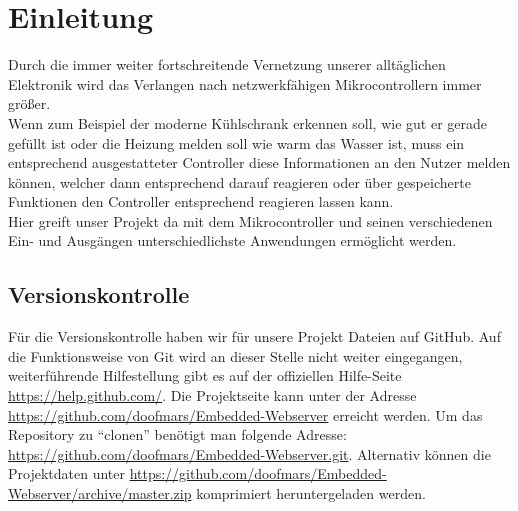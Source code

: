 \chapter{Einleitung}

Durch die immer weiter fortschreitende Vernetzung unserer alltäglichen Elektronik
wird das Verlangen nach netzwerkfähigen Mikrocontrollern
immer größer. \\
Wenn zum Beispiel der moderne Kühlschrank erkennen soll, wie gut er gerade
gefüllt ist oder die Heizung melden soll wie warm das Wasser ist, muss ein
entsprechend ausgestatteter Controller diese Informationen an den Nutzer
melden können, welcher dann entsprechend darauf reagieren oder über gespeicherte 
Funktionen den Controller entsprechend reagieren lassen kann.\\ 
Hier greift unser Projekt da mit dem Mikrocontroller und seinen
verschiedenen Ein- und Ausgängen unterschiedlichste Anwendungen ermöglicht
werden.


\section{Versionskontrolle}

Für die Versionskontrolle haben wir für unsere Projekt Dateien auf GitHub. Auf
die Funktionsweise von Git wird an dieser Stelle nicht weiter eingegangen,
weiterführende Hilfestellung gibt es auf der offiziellen Hilfe-Seite
\url{https://help.github.com/}. Die Projektseite kann unter der Adresse
\url{https://github.com/doofmars/Embedded-Webserver} erreicht werden. Um das
Repository zu "`clonen"' benötigt man folgende Adresse:
\url{https://github.com/doofmars/Embedded-Webserver.git}. Alternativ können die
Projektdaten unter \url{https://github.com/doofmars/Embedded-Webserver/archive/master.zip} 
komprimiert heruntergeladen werden.


